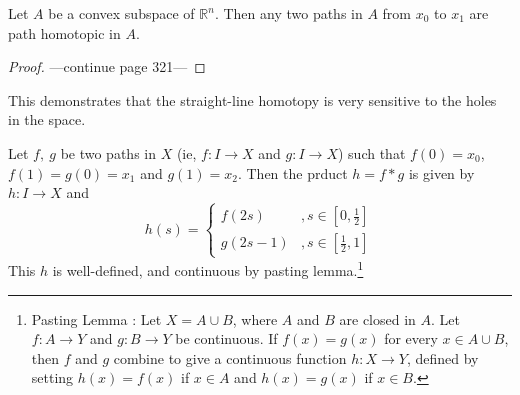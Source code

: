 \begin{remark}
	Let $A$ be a convex subspace of $\mathbb{R}^n$. Then any two paths in $A$ from $x_0$ to $x_1$ are path homotopic in $A$.
\end{remark}
\begin{proof}
	---continue page 321---
\end{proof}

\begin{remark}\cite[\S{}51 Example 2 pp. 321]{munkres}
\begin{commentary}
	This demonstrates that the straight-line homotopy is very sensitive to the holes in the space.
\end{commentary}
\end{remark}

\begin{definition}
	Let $f,\ g$ be two paths in $X$ (ie, $f : I \to X$ and $g: I \to X$) such that $f(0)=x_0$, $f(1)=g(0)=x_1$ and $g(1)=x_2$. Then the prduct $h = f \ast g$ is given by $h : I \to X$ and
	\[ h(s) = \begin{cases} f(2s) & , s \in [0,\frac{1}{2}] \\ g(2s-1) & , s \in [\frac{1}{2},1] \end{cases} \]
		This $h$ is well-defined, and continuous by pasting lemma.\footnote{Pasting Lemma : Let $X = A \cup B$, where $A$ and $B$ are closed in $A$. Let $f : A \to Y$ and $g : B \to Y$ be continuous. If $f(x) = g(x)$ for every $x \in A \cup B$, then $f$ and $g$ combine to give a continuous function $h : X \to Y$, defined by setting $h(x) = f(x)$ if $x \in A$ and $h(x) = g(x)$ if $x \in B$.}
\end{definition}

